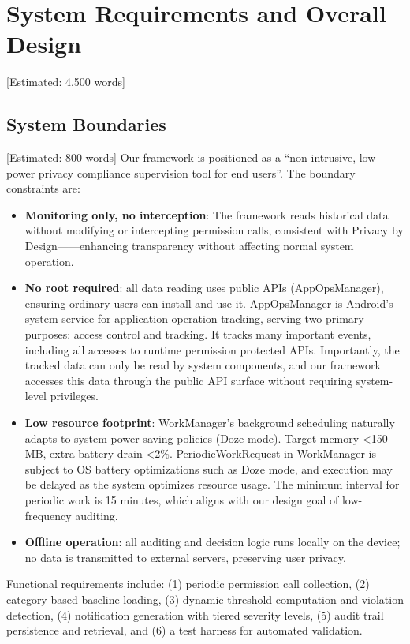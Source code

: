 \newpage\section{System Requirements and Overall Design} [Estimated: 4,500 words]

\subsection{System Boundaries} [Estimated: 800 words]
Our framework is positioned as a ``non-intrusive, low-power privacy compliance supervision tool for end users''. The boundary constraints are:

\begin{itemize}
\item \textbf{Monitoring only, no interception}: The framework reads historical data without modifying or intercepting permission calls, consistent with Privacy by Design——enhancing transparency without affecting normal system operation.
\item \textbf{No root required}: all data reading uses public APIs (AppOpsManager), ensuring ordinary users can install and use it. AppOpsManager is Android's system service for application operation tracking, serving two primary purposes: access control and tracking. It tracks many important events, including all accesses to runtime permission protected APIs. Importantly, the tracked data can only be read by system components, and our framework accesses this data through the public API surface without requiring system-level privileges.
\item \textbf{Low resource footprint}: WorkManager's background scheduling naturally adapts to system power-saving policies (Doze mode). Target memory <150 MB, extra battery drain <2\%. PeriodicWorkRequest in WorkManager is subject to OS battery optimizations such as Doze mode, and execution may be delayed as the system optimizes resource usage. The minimum interval for periodic work is 15 minutes, which aligns with our design goal of low-frequency auditing.
\item \textbf{Offline operation}: all auditing and decision logic runs locally on the device; no data is transmitted to external servers, preserving user privacy.
\end{itemize}

Functional requirements include: (1) periodic permission call collection, (2) category-based baseline loading, (3) dynamic threshold computation and violation detection, (4) notification generation with tiered severity levels, (5) audit trail persistence and retrieval, and (6) a test harness for automated validation.


